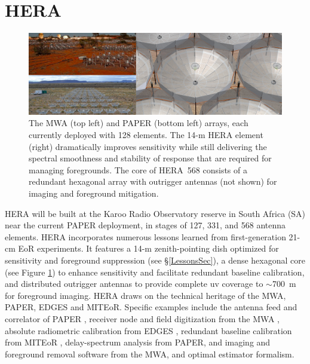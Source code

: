 \documentclass[preprint]{aastex}
\begin{document}

\vspace{-0.25in}
\section{HERA}
\label{PDsec}
\begin{figure}[t]\centering
\includegraphics[width=6.5in]{plots/PAPER_and_MWA_and_HERA.jpg}
\caption{\small
The MWA (top left) and PAPER (bottom left) arrays, each currently deployed with 128 elements.
The 14-m HERA element (right) dramatically improves sensitivity
while still delivering the spectral smoothness and stability of response that
are required for managing foregrounds.
The core of HERA~568 consists of a redundant hexagonal array with
outrigger antennas (not shown) for imaging and foreground mitigation.
}
\label{HERAfig}
\end{figure}

HERA will be built at the Karoo Radio Observatory reserve in South Africa (SA) near the
current PAPER deployment, in stages of 127, 331, and 568 antenna elements.
HERA 
incorporates numerous lessons learned from first-generation 21-cm EoR experiments.
It features a 14-m zenith-pointing dish optimized for sensitivity and foreground suppression 
(see \S\ref{LessonsSec}),
a dense hexagonal core (see Figure \ref{HERAfig}) to enhance sensitivity and facilitate 
redundant baseline calibration,
and distributed outrigger antennas to provide
complete uv coverage to $\sim$700~m for foreground imaging.
HERA draws on the technical heritage of the MWA, PAPER,
EDGES and MITEoR. Specific examples include the antenna feed and correlator of
PAPER \citep{bradley_et_al2005}, receiver node and field digitization 
from the MWA \citep{lonsdale_et_al2009_trunc,tingay_et_al2013_trunc}, absolute radiometric
calibration from EDGES \citep{rogers_2012}, redundant baseline calibration 
from MITEoR \citep{zheng_et_al2013_trunc}, 
delay-spectrum analysis from PAPER, and imaging and foreground
removal software from the MWA, and optimal estimator formalism.
\end{document}
